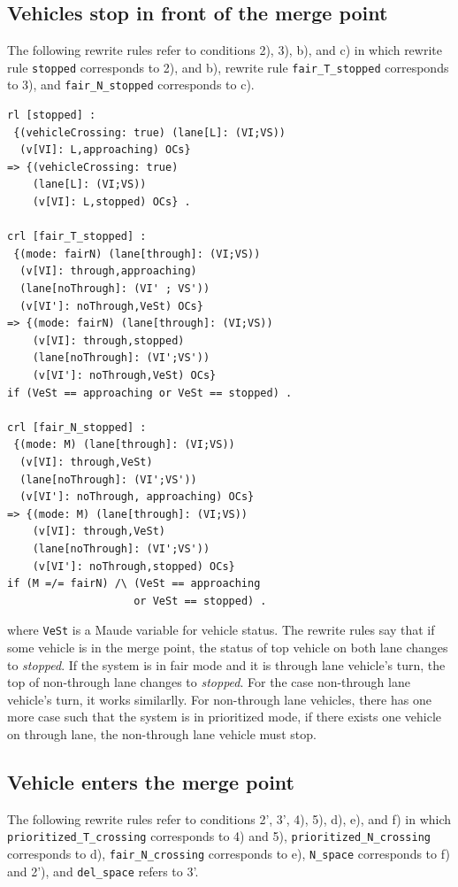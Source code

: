 \documentclass[10pt, conference, compsocconf]{IEEEtran}
\begin{document}
\subsection{Vehicles stop in front of the merge point}
The following rewrite rules refer to conditions 2), 3), b), and c) in which 
rewrite rule \verb!stopped! corresponds to 2), and b), rewrite rule 
\verb!fair_T_stopped! corresponds to 3), and \verb!fair_N_stopped! corresponds
to c).
\begin{small}
  \begin{verbatim}
rl [stopped] : 
 {(vehicleCrossing: true) (lane[L]: (VI;VS)) 
  (v[VI]: L,approaching) OCs} 
=> {(vehicleCrossing: true) 
    (lane[L]: (VI;VS)) 
    (v[VI]: L,stopped) OCs} .

crl [fair_T_stopped] : 
 {(mode: fairN) (lane[through]: (VI;VS)) 
  (v[VI]: through,approaching) 
  (lane[noThrough]: (VI' ; VS')) 
  (v[VI']: noThrough,VeSt) OCs} 
=> {(mode: fairN) (lane[through]: (VI;VS)) 
    (v[VI]: through,stopped)
    (lane[noThrough]: (VI';VS')) 
    (v[VI']: noThrough,VeSt) OCs} 
if (VeSt == approaching or VeSt == stopped) .

crl [fair_N_stopped] : 
 {(mode: M) (lane[through]: (VI;VS)) 
  (v[VI]: through,VeSt) 
  (lane[noThrough]: (VI';VS')) 
  (v[VI']: noThrough, approaching) OCs} 
=> {(mode: M) (lane[through]: (VI;VS)) 
    (v[VI]: through,VeSt)
    (lane[noThrough]: (VI';VS')) 
    (v[VI']: noThrough,stopped) OCs} 
if (M =/= fairN) /\ (VeSt == approaching 
                    or VeSt == stopped) .    
  \end{verbatim}
\end{small}

\noindent where \verb!VeSt! is a Maude variable for vehicle status.
The rewrite rules say that if some vehicle is in the merge point,
the status of top vehicle on both lane changes to \textit{stopped}.
If the system is in fair mode and it is through lane vehicle's turn,
the top of non-through lane changes to \textit{stopped}. For the case 
non-through lane vehicle's turn, it works similarlly.
For non-through lane vehicles, there has one more case such that the system
is in prioritized mode, if there exists one vehicle on through lane, 
the non-through lane vehicle must stop.

\subsection{Vehicle enters the merge point}
The following rewrite rules refer to conditions 2', 3', 4), 5), d), e), and f)
in which \verb!prioritized_T_crossing! corresponds to 4) and 5), \verb!prioritized_N_crossing!
corresponds to d), \verb!fair_N_crossing! corresponds to e), \verb!N_space! 
corresponds to f) and 2'), and \verb!del_space! refers to 3'.
\end{document}

